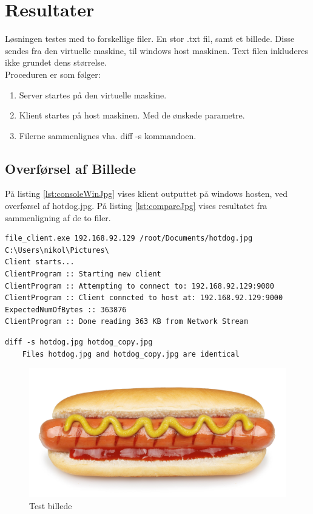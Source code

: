 \section{Resultater}
Løsningen testes med to forskellige filer. En stor .txt fil, samt et billede. Disse sendes fra den virtuelle maskine, til windows host maskinen. Text filen inkluderes ikke grundet dens størrelse. \\

Proceduren er som følger:
\begin{enumerate}
	\item Server startes på den virtuelle maskine.
	\item Klient startes på host maskinen. Med de ønskede parametre.
	\item Filerne sammenlignes vha. diff -s kommandoen.
\end{enumerate}

\subsection{Overførsel af Billede}
På listing \ref{lst:consoleWinJpg} vises klient outputtet på windows hosten, ved overførsel af hotdog.jpg. På listing \ref{lst:compareJpg} vises resultatet fra sammenligning af de to filer.

\begin{lstlisting}[caption=Konsol fra windows klient, label=lst:consoleWinJpg]
file_client.exe 192.168.92.129 /root/Documents/hotdog.jpg C:\Users\nikol\Pictures\
Client starts...
ClientProgram :: Starting new client
ClientProgram :: Attempting to connect to: 192.168.92.129:9000
ClientProgram :: Client conncted to host at: 192.168.92.129:9000
ExpectedNumOfBytes :: 363876
ClientProgram :: Done reading 363 KB from Network Stream
\end{lstlisting}

\begin{lstlisting}[caption=Konsol output fra sammenligning, label=lst:compareJpg]
	diff -s hotdog.jpg hotdog_copy.jpg
	Files hotdog.jpg and hotdog_copy.jpg are identical
\end{lstlisting}

\begin{figure}[ht]
	\centering
	\includegraphics[width=.5\textwidth]{TCP/hotdog.jpg}
	\caption{Test billede}
	\label{fig:hotdog}
\end{figure}

